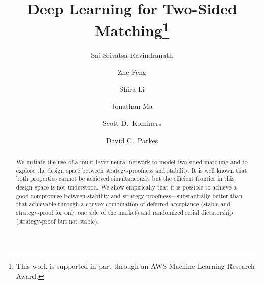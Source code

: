 \documentclass[11pt,letterpaper]{article}
\theoremstyle{definition}
\newcommand{\kibitz}[2]{\ifnum\Comments=1{\color{#1}{#2}}\fi}
\newcommand{\dcp}[1]{\kibitz{orange}{[DCP: #1]}}
\newcommand{\sdk}[1]{\kibitz{brass}{[SDK: #1]}}
\begin{document}
	
	
\title{Deep Learning for Two-Sided Matching\thanks{This work is supported in part through an AWS Machine Learning Research Award.}}

\author[a]{Sai Srivatsa Ravindranath}
\author[a]{Zhe Feng}
\author[b]{Shira Li}
\author[b]{Jonathan Ma}
\author[c]{Scott D.~Kominers}
\author[a]{David C.~Parkes}
%
%
%



\maketitle



\begin{abstract}
%
%
We initiate the use of a multi-layer neural network to model two-sided matching and to explore the design space between strategy-proofness and stability. It is well known that both properties cannot be achieved simultaneously but the 
efficient frontier in 
this design space is not understood.
We show empirically that it is possible to achieve a good compromise between stability and strategy-proofness---substantially better than that achievable through a convex combination of deferred acceptance  (stable and strategy-proof for only one side of the market) and randomized serial dictatorship  (strategy-proof but not stable).
\end{abstract}
\end{document}
